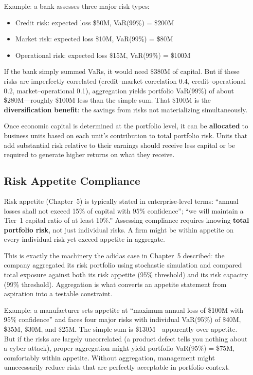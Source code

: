 \documentclass[11pt,openany]{book}
\providecommand{\tightlist}{\setlength{\itemsep}{0pt}\setlength{\parskip}{0pt}}
\begin{document}
Example: a bank assesses three major risk types:
\begin{itemize}\tightlist
  \item Credit risk: expected loss \$50M, VaR(99\%) = \$200M
  \item Market risk: expected loss \$10M, VaR(99\%) = \$80M
  \item Operational risk: expected loss \$15M, VaR(99\%) = \$100M
\end{itemize}

If the bank simply summed VaRs, it would need \$380M of capital. But if these
risks are imperfectly correlated (credit--market correlation 0.4,
credit--operational 0.2, market--operational 0.1), aggregation yields
portfolio VaR(99\%) of about \$280M---roughly \$100M less than the simple sum.
That \$100M is the \textbf{diversification benefit}: the savings from risks
not materializing simultaneously.

Once economic capital is determined at the portfolio level, it can be
\textbf{allocated} to business units based on each unit's contribution to
total portfolio risk. Units that add substantial risk relative to their
earnings should receive less capital or be required to generate higher returns
on what they receive.

\subsection{Risk Appetite Compliance}
\label{subsec:appetite-compliance}

Risk appetite (Chapter~5) is typically stated in enterprise-level terms:
``annual losses shall not exceed 15\% of capital with 95\% confidence''; ``we
will maintain a Tier~1 capital ratio of at least 10\%.'' Assessing compliance
requires knowing \textbf{total portfolio risk}, not just individual risks. A
firm might be within appetite on every individual risk yet exceed appetite in
aggregate.

This is exactly the machinery the adidas case in Chapter~5 described: the
company aggregated its risk portfolio using stochastic simulation and compared
total exposure against both its risk appetite (95\% threshold) and its risk
capacity (99\% threshold). Aggregation is what converts an appetite statement
from aspiration into a testable constraint.

Example: a manufacturer sets appetite at ``maximum annual loss of \$100M with
95\% confidence'' and faces four major risks with individual VaR(95\%) of
\$40M, \$35M, \$30M, and \$25M. The simple sum is \$130M---apparently over
appetite. But if the risks are largely uncorrelated (a product defect tells
you nothing about a cyber attack), proper aggregation might yield portfolio
VaR(95\%) = \$75M, comfortably within appetite. Without aggregation,
management might unnecessarily reduce risks that are perfectly acceptable in
portfolio context.
\end{document}
